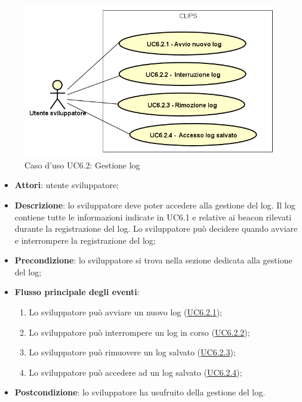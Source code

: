 \documentclass[../AnalisiDeiRequisiti.tex]{subfiles}
\begin{document}
        \begin{figure}[!h]
            \centering
            \includegraphics[scale=0.95, width=\textwidth]{img/UC6-2.png}
            \caption{Caso d'uso UC6.2: Gestione log}\label{fig:UC6.2} 
        \end{figure}
\begin{itemize}
\item \textbf{Attori}: utente sviluppatore;
\item \textbf{Descrizione}: lo sviluppatore deve poter accedere alla gestione del log. Il log contiene tutte le informazioni indicate in UC6.1 e relative ai beacon rilevati durante la registrazione del log. Lo sviluppatore può decidere quando avviare e interrompere la registrazione del log; 
      \item \textbf{Precondizione}: lo sviluppatore si trova nella sezione dedicata alla gestione del log;

        \item \textbf{Flusso principale degli eventi}:
          \begin{enumerate}
          \item Lo sviluppatore può avviare un nuovo log (\hyperlink{UC6.2.1}{UC6.2.1});
          \item Lo sviluppatore può interrompere un log in corso (\hyperlink{UC6.2.2}{UC6.2.2});
          \item Lo sviluppatore può rimuovere un log salvato (\hyperlink{UC6.2.3}{UC6.2.3});
          \item Lo sviluppatore può accedere ad un log salvato (\hyperlink{UC6.2.4}{UC6.2.4});

      \end{enumerate}
    \item \textbf{Postcondizione}: lo sviluppatore ha usufruito della gestione del log.
  \end{itemize}
\hypertarget{UC6.2.1}{}
\end{document}
